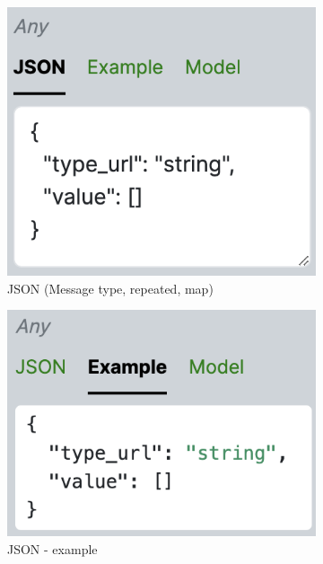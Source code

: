 \begin{figure}[!htb]
    \begin{subfigure}{.33\textwidth}
        \centering
        \includegraphics[width=.95\linewidth]{images/implementation/screenshots/input-json-field}
        \caption{JSON (Message type, repeated, map)}
    \end{subfigure}
    \begin{subfigure}{.33\textwidth}
        \centering
        \includegraphics[width=.95\linewidth]{images/implementation/screenshots/input-json-example}
        \caption{JSON - example}
    \end{subfigure}%
    \begin{subfigure}{.33\textwidth}
        \centering

\end{subfigure}
\end{figure}
